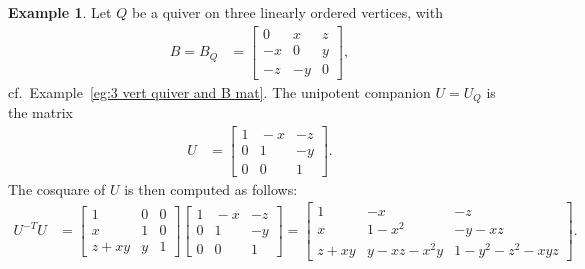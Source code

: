 \documentclass[11pt, letterpaper]{amsart}
\theoremstyle{definition}
\newtheorem{example}[theorem]{Example}
\numberwithin{equation}{section}
\begin{document}
\begin{example}
\label{eg:U-n=3}
Let $Q$ be a quiver on three linearly ordered vertices, with 
\begin{align*}
B=B_Q&=\begin{bmatrix} 
0 & x & z \\
-x & 0 & y \\
-z & -y & 0
\end{bmatrix},
\end{align*}
cf.\ Example~\ref{eg:3 vert quiver and B mat}. 
The unipotent companion $U=U_Q$ is  the matrix
\begin{align*}
U&=\begin{bmatrix} 
1 &  \! \!-x \! \! & -z \\
0 &  \! \!1 \! \! & -y \\
0 &  \! \!0 \! \! & 1
\end{bmatrix}. 
\end{align*}
The cosquare of $U$ is then computed as follows: 
\begin{align*}
U^{-T} U
&=
\begin{bmatrix} 
1 &  0 & 0 \\
x &  1 & 0 \\
z+xy & y & 1
\end{bmatrix}
\begin{bmatrix} 
1 &  \! \!-x \! \! & -z \\
0 &  \! \!1 \! \! & -y \\
0 &  \! \!0 \! \! & 1
\end{bmatrix}
=
\begin{bmatrix} 
1 &  -x & -z \\
x & 1-x^2 & -y-xz \\
z+xy & y- xz-x^2y   & 1 - y^2 - z^2 -xyz
\end{bmatrix}
\!\!.
\end{align*}
\end{example}
\end{document}
